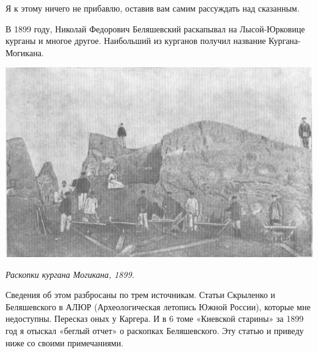 Я к этому ничего не прибавлю, оставив вам самим рассуждать над сказанным.

В 1899 году, Николай Федорович Беляшевский раскапывал на Лысой-Юрковице курганы и многое другое. Наибольший из курганов получил название Кургана-Могикана.

\begin{center}
\includegraphics[width=\linewidth]{chast-kirvys/lys02/1899-mogikan.jpg}

\textit{Раскопки кургана Могикана, 1899.}
\end{center} 

Сведения об этом разбросаны по трем источникам. Статьи Скрыленко и Беляшевского в АЛЮР (Археологическая летопись Южной России), которые мне недоступны. Пересказ оных у Каргера. И в 6 томе «Киевской старины» за 1899 год я отыскал «беглый отчет» о раскопках Беляшевского. Эту статью и приведу ниже со своими примечаниями.





